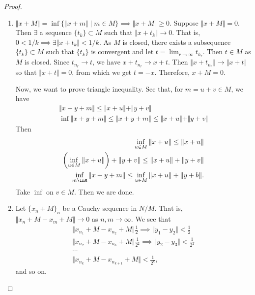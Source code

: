 \documentclass{amsart}
\begin{document}
\begin{proof}
\label{sec:29082022}
\begin{enumerate}
\item\label{item:16} $\Vert x + M \Vert = \inf \{ \Vert x + m \Vert \mid m\in M \} \implies \Vert x + M \Vert \geq 0$. Suppose $\Vert x + M \Vert = 0$. Then $\exists$ a sequence $\{ t_k \} \subset M$ such that $\Vert x + t_k \Vert \to 0$. That is, $0 < 1/k \implies \exists \Vert x + t_k \Vert < 1/k$. As $M$ is closed, there exists a subsequence $\{t_k\} \subset M$ such that $\{t_k\}$ is convergent and let $\displaystyle t = \lim_{r\to\infty} t_{k_r}$. Then $t\in M$ as $M$ is closed. Since $t_{n_r} \to t$, we have $x+t_{n_r} \to x + t$. Then $\Vert x + t_{n_r} \Vert \to \Vert x + t \Vert$ so that $\Vert x+t \Vert = 0$, from which we get $t = -x$. Therefore, $x+M = 0$.

  Now, we want to prove triangle inequality. See that, for $m=u+v \in M$, we have 
\begin{align*}
  \Vert x + y + m \Vert \leq \Vert x + u \Vert + \Vert y + v \Vert \\
  \inf \Vert x + y + m \Vert \leq \Vert x + y + m \Vert \leq \Vert x + u \Vert + \Vert y + v \Vert
\end{align*}
Then 
\begin{align*}
  \inf_{u\in M} \Vert x + u \Vert \leq \Vert x + u \Vert \\
  \left(\inf_{u\in M} \Vert x + u \Vert \right) + \Vert y + v \Vert \leq \Vert x + u \Vert + \Vert y + v \Vert \\
  \inf_{m\inM} \Vert x + y + m \Vert \leq \inf_{u\in M } \Vert x + u \Vert + \Vert y + b \Vert.
\end{align*}
Take $\inf$ on $v\in M$. Then we are done. 
\item\label{item:18} Let $\{ x_n + M\}_n$ be a Cauchy sequence in $N/M$. That is, $\Vert x_n + M - x_m + M\Vert \to 0$ as $n, m \to \infty$. We see that 
\begin{align*}
  \Vert x_{n_1} + M - x_{n_2} + M \Vert \frac{1}{2} \implies \Vert y_1-y_2 \Vert < \frac{1}{2} \\
  \Vert x_{n_2} + M - x_{n_3} + M \Vert \frac{1}{2^2} \implies \Vert y_2-y_3 \Vert < \frac{1}{2^2} \\
  \cdots\\
  \Vert x_{n_k} + M - x_{n_{k+1}} + M \Vert < \frac{1}{2^k},
\end{align*}
and so on.
\end{enumerate}
\end{proof}


\end{document}
